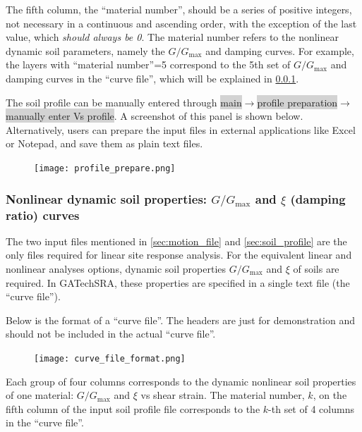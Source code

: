 \documentclass[11pt,letterpaper]{article}
\newcommand{\panel}[1]{\colorbox{lightgray}{\textsf{#1}}}
\begin{document}
The fifth column, the ``material number'', should be a series of positive integers, not necessary in a continuous and ascending order, with the exception of the last value, which \emph{should always be 0}. The material number refers to the nonlinear dynamic soil parameters, namely the $G/G_{\max}$ and damping curves. For example, the layers with ``material number''=5 correspond to the 5th set of $G/G_{\max}$ and damping curves in the ``curve file'', which will be explained in \ref{sec:curve}.

The soil profile can be manually entered through \panel{main}$\rightarrow$\panel{profile preparation}$\rightarrow$\panel{manually enter Vs profile}. A screenshot of this panel is shown below.  Alternatively, users can prepare the input files in external applications like Excel or Notepad, and save them as plain text files.

\begin{figure}[H]
\centering
  \texttt{[image: profile\_prepare.png]}\\
\end{figure}

\subsubsection{Nonlinear dynamic soil properties: $G/G_{\max}$ and $\xi$ (damping ratio) curves}\label{sec:curve}

The two input files mentioned in \ref{sec:motion_file} and \ref{sec:soil_profile} are the only files required for linear site response analysis. For the equivalent linear and nonlinear analyses options, dynamic soil properties $G/G_{\max}$ and $\xi$ of soils are required. In GATechSRA, these properties are specified in a single text file (the ``curve file'').

Below is the format of a ``curve file''. The headers are just for demonstration and should not be included in the actual ``curve file''.

\begin{figure}[H]
\centering
  \texttt{[image: curve\_file\_format.png]}\\
\end{figure}

Each group of four columns corresponds to the dynamic nonlinear soil properties of one material: $G/G_{\max}$ and $\xi$ vs shear strain. The material number, $k$, on the fifth column of the input soil profile file corresponds to the $k$-th set of 4 columns in the ``curve file''.
\end{document}
